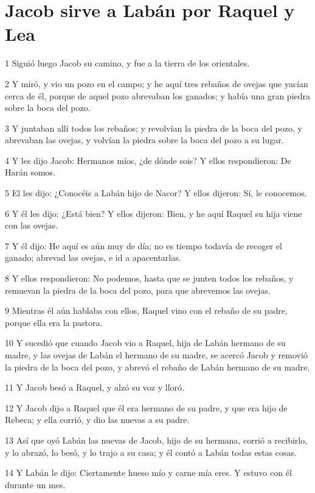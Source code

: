 \section*{Jacob sirve a Labán por Raquel y Lea}

\par 1 Siguió luego Jacob su camino, y fue a la tierra de los orientales.
\par 2 Y miró, y vio un pozo en el campo; y he aquí tres rebaños de ovejas que yacían cerca de él, porque de aquel pozo abrevaban los ganados; y había una gran piedra sobre la boca del pozo.
\par 3 Y juntaban allí todos los rebaños; y revolvían la piedra de la boca del pozo, y abrevaban las ovejas, y volvían la piedra sobre la boca del pozo a su lugar.
\par 4 Y les dijo Jacob: Hermanos míos, ¿de dónde sois? Y ellos respondieron: De Harán somos.
\par 5 El les dijo: ¿Conocéis a Labán hijo de Nacor? Y ellos dijeron: Sí, le conocemos.
\par 6 Y él les dijo: ¿Está bien? Y ellos dijeron: Bien, y he aquí Raquel su hija viene con las ovejas.
\par 7 Y él dijo: He aquí es aún muy de día; no es tiempo todavía de recoger el ganado; abrevad las ovejas, e id a apacentarlas.
\par 8 Y ellos respondieron: No podemos, hasta que se junten todos los rebaños, y remuevan la piedra de la boca del pozo, para que abrevemos las ovejas.
\par 9 Mientras él aún hablaba con ellos, Raquel vino con el rebaño de su padre, porque ella era la pastora.
\par 10 Y sucedió que cuando Jacob vio a Raquel, hija de Labán hermano de su madre, y las ovejas de Labán el hermano de su madre, se acercó Jacob y removió la piedra de la boca del pozo, y abrevó el rebaño de Labán hermano de su madre.
\par 11 Y Jacob besó a Raquel, y alzó su voz y lloró.
\par 12 Y Jacob dijo a Raquel que él era hermano de su padre, y que era hijo de Rebeca; y ella corrió, y dio las nuevas a su padre.
\par 13 Así que oyó Labán las nuevas de Jacob, hijo de su hermana, corrió a recibirlo, y lo abrazó, lo besó, y lo trajo a su casa; y él contó a Labán todas estas cosas.
\par 14 Y Labán le dijo: Ciertamente hueso mío y carne mía eres. Y estuvo con él durante un mes.
